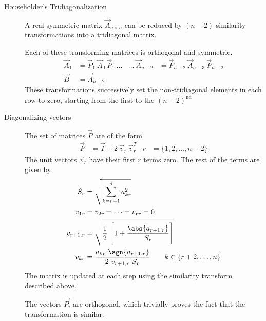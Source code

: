 \begin{description}
    \item[Householder's Tridiagonalization] A real symmetric matrix
        $ \vec{A}_{n \times n} $ can be reduced by $ (n-2) $ similarity transformations
        into a tridiagonal matrix. \par
        Each of these transforming matrices is orthogonal and symmetric.
        \begin{align}
            \vec{A}_1            & = \vec{P}_1\ \vec{A}_0\ \vec{P}_1\ \dots      &
            \dots\ \vec{A}_{n-2} & = \vec{P}_{n-2}\ \vec{A}_{n-3}\ \vec{P}_{n-2}   \\
            \vec{B}              & = \vec{A}_{n-2}
        \end{align}
        These transformations successively set the non-tridiagonal elements in each
        row to zero, starting from the first to the $ (n-2)^{\text{nd}} $

    \item[Diagonalizing vectors] The set of matrices $ \vec{P} $ are of the form
        \begin{align}
            \vec{P} & = \vec{I} - 2\ \vec{v}_r\ \vec{v}_r^T &
            r       & = \{1,2,\dots,n-2\}
        \end{align}
        The unit vectors $ \vec{v}_r $ have their first $ r $ terms zero. The rest of
        the terms are given by
        \begin{align}
            S_r       & = \sqrt{\sum_{k=r+1}^{n} a^2_{kr}}                     \\
            v_{1r}    & = v_{2r} = \dots = v_{rr} = 0                          \\
            v_{r+1,r} & = \sqrt{\frac{1}{2}\ \Bigg[ 1 + \frac{\abs{a_{r+1,r}}}
            {S_r} \Bigg]}                                                      \\
            v_{kr}    & = \frac{a_{kr}\ \sgn{a_{r+1,r}}}{2\ v_{r+1,r}\ S_r}
            \qquad k \in \{r+2,\dots,n\}
        \end{align}
        The matrix is updated at each step using the similarity transform described
        above. \par
        The vectors $ \vec{P_i} $ are orthogonal, which trivially proves the fact that
        the transformation is similar.


\end{description}
